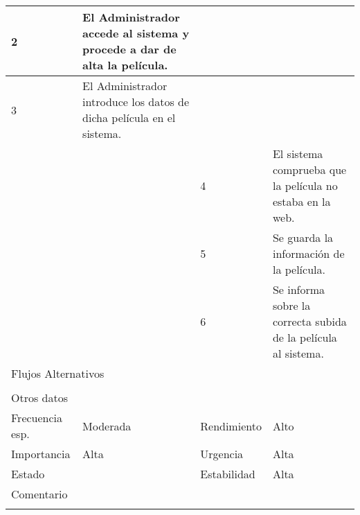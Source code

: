\documentclass{article}
\begin{document}
\begin{table}[h]
\begin{tabular}{|l|l|l|l|l|l|}
\hline
\multicolumn{1}{|p{1cm}|}{2} & \multicolumn{2}{p{3cm}}{El Administrador accede al sistema y procede a dar de alta la película.} & \multicolumn{1}{|p{1cm}|}{} & \multicolumn{2}{p{3cm}|}{}\\
\hline
\multicolumn{1}{|p{1cm}|}{3} & \multicolumn{2}{p{3cm}}{El Administrador introduce los datos de dicha película en el sistema.} & \multicolumn{1}{|p{1cm}|}{} & \multicolumn{2}{p{3cm}|}{}\\
\hline
\multicolumn{1}{|p{1cm}|}{} & \multicolumn{2}{p{3cm}}{} & \multicolumn{1}{|p{1cm}|}{4} & \multicolumn{2}{p{3cm}|}{El sistema comprueba que la película no estaba en la web.}\\
\hline
\multicolumn{1}{|p{1cm}|}{} & \multicolumn{2}{p{3cm}}{} & \multicolumn{1}{|p{1cm}|}{5} & \multicolumn{2}{p{3cm}|}{Se guarda la información de la película.}\\
\hline
\multicolumn{1}{|p{1cm}|}{} & \multicolumn{2}{p{3cm}}{} & \multicolumn{1}{|p{1cm}|}{6} & \multicolumn{2}{p{3cm}|}{Se informa sobre la correcta subida de la película al sistema.}\\
\hline
\multicolumn{6}{|p{10cm}|}{Flujos Alternativos}\\
\hline
\multicolumn{1}{|p{1cm}}{} & \multicolumn{5}{|p{9cm}|}{}\\
\hline
\multicolumn{6}{|p{10cm}|}{Otros datos}\\
\hline
\multicolumn{1}{|p{2cm}|}{Frecuencia esp.} & \multicolumn{2}{p{3cm}}{Moderada} & \multicolumn{1}{|p{2cm}|}{Rendimiento} & \multicolumn{2}{p{3cm}|}{Alto}\\
\hline
\multicolumn{1}{|p{2cm}|}{Importancia} & \multicolumn{2}{p{3cm}}{Alta} & \multicolumn{1}{|p{2cm}|}{Urgencia} & \multicolumn{2}{p{3cm}|}{Alta}\\
\hline
\multicolumn{1}{|p{2cm}|}{Estado} & \multicolumn{2}{p{3cm}}{} & \multicolumn{1}{|p{2cm}|}{Estabilidad} & \multicolumn{2}{p{3cm}|}{Alta}\\
\hline
\multicolumn{6}{|p{10cm}|}{Comentario}\\
\hline
\multicolumn{6}{|p{10cm}|}{}\\
\hline
\end{tabular}
\end{table}
\addtocounter{ni}{1}
\end{document}
